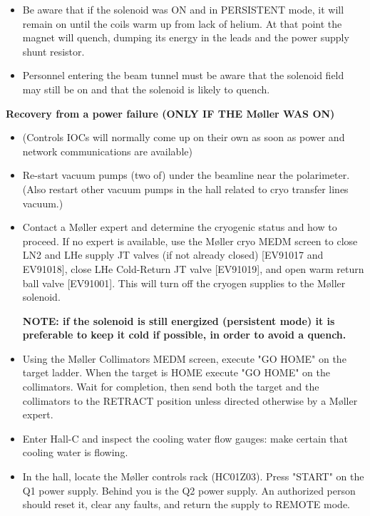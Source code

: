 {\begin{itemize}
\item Be aware that if the solenoid was ON and in PERSISTENT mode,
it will remain on until the coils warm up from lack of helium.
At that point the magnet will quench, dumping its energy in
the leads and the power supply shunt resistor.

\item Personnel entering the beam tunnel must be aware that the
solenoid field may still be on and that the solenoid is likely
to quench.
\end{itemize}

{\bf Recovery from a power failure (ONLY IF THE M\o ller WAS ON)}
\begin{itemize}
\item (Controls IOCs will normally come up on their own as soon as
power and network communications are available)

\item Re-start vacuum pumps (two of) under the beamline near the
polarimeter. (Also restart other vacuum pumps in the hall related
to cryo transfer lines vacuum.)

\item Contact a M\o ller expert and determine the cryogenic status and
how to proceed. If no expert is available, use the M\o ller cryo MEDM
screen to close LN2 and LHe supply JT valves (if not already closed)
[EV91017 and EV91018], close LHe Cold-Return JT valve [EV91019],
and open warm return ball valve [EV91001]. This will turn off the
cryogen supplies to the M\o ller solenoid.

{\bf NOTE: if the solenoid is still energized (persistent mode) it
is preferable to keep it cold if possible, in order to avoid a
quench.}

\item Using the M\o ller Collimators MEDM screen, execute "GO HOME" on
the target ladder. When the target is HOME execute "GO HOME" on
the collimators. Wait for completion, then send both the target
and the collimators to the RETRACT position unless directed
otherwise by a M\o ller expert.

\item Enter Hall-C and inspect the cooling water flow gauges: make
certain that cooling water is flowing.

\item In the hall, locate the M\o ller controls rack (HC01Z03). Press
"START" on the Q1 power supply. Behind you is the Q2 power supply.
An authorized person should reset it, clear any faults, and return
the supply to REMOTE mode.


\end{itemize}}
